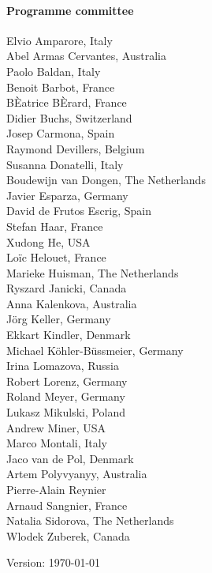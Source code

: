 \documentclass[10pt,a4paper]{article}
\begin{document}
\begin{multicols}{2}
\paragraph*{Programme committee}\mbox{}
\begin{multicols}{2}
\noindent
Elvio Amparore, Italy \\
Abel Armas Cervantes, Australia \\
Paolo Baldan, Italy \\
Benoit Barbot, France  \\
BÈatrice BÈrard, France \\
Didier Buchs, Switzerland \\
Josep Carmona, Spain \\
Raymond Devillers, Belgium \\
Susanna Donatelli, Italy \\
Boudewijn van Dongen, The Netherlands \\
Javier Esparza, Germany \\
David de Frutos Escrig, Spain \\
Stefan Haar, France \\
Xudong He, USA \\
Lo\"{i}c Helouet, France \\
Marieke Huisman, The Netherlands \\
\columnbreak
Ryszard Janicki, Canada \\
Anna Kalenkova, Australia \\
J\"{o}rg Keller, Germany \\
Ekkart Kindler, Denmark \\
Michael K\"{o}hler-B\"{u}ssmeier, Germany \\
Irina Lomazova, Russia \\
Robert Lorenz, Germany \\
Roland Meyer, Germany \\
Lukasz Mikulski, Poland \\
Andrew Miner, USA \\
Marco Montali, Italy \\
Jaco van de Pol, Denmark \\
Artem Polyvyanyy, Australia \\
Pierre-Alain Reynier \\
Arnaud Sangnier, France \\
Natalia Sidorova, The Netherlands \\
Wlodek Zuberek, Canada

{\tiny \textcolor{black!2}{Version: \today{}}}
\end{multicols}
\end{multicols}
\end{document}
